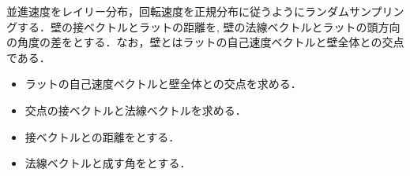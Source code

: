 並進速度をレイリー分布，回転速度を正規分布に従うようにランダムサンプリングする．壁の接ベクトルとラットの距離を, 壁の法線ベクトルとラットの頭方向の角度の差をとする．なお，壁とはラットの自己速度ベクトルと壁全体との交点である．

\begin{itemize}
\item ラットの自己速度ベクトルと壁全体との交点を求める．
\item 交点の接ベクトルと法線ベクトルを求める．
\item 接ベクトルとの距離をとする．
\item 法線ベクトルと成す角をとする．
\end{itemize}
